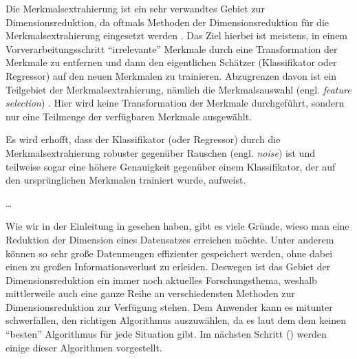 Die Merkmalsextrahierung ist ein sehr verwandtes Gebiet zur Dimensionsreduktion, da oftmals
Methoden der Dimensionsreduktion für die Merkmalsextrahierung eingesetzt werden \parencite[3]{Guyon.2006b}. Das Ziel hierbei ist meistens, in einem Vorverarbeitungsschritt
\enquote{irrelevante} Merkmale durch eine Transformation der Merkmale zu entfernen und dann den
eigentlichen Schätzer (Klassifikator oder Regressor) auf den neuen Merkmalen zu trainieren.
Abzugrenzen davon ist ein Teilgebiet der Merkmalsextrahierung, nämlich die Merkmalsauswahl (engl.
\textit{feature selection}) \parencite{Blum.1997}. Hier wird keine Transformation der Merkmale durchgeführt, sondern nur eine
Teilmenge der verfügbaren Merkmale ausgewählt.

Es wird erhofft, dass der Klassifikator (oder Regressor) durch die Merkmalsextrahierung robuster
gegenüber Rauschen (engl. \textit{noise}) ist und teilweise sogar eine höhere Genauigkeit gegenüber
einem Klassifikator, der auf den ursprünglichen Merkmalen trainiert wurde, aufweist.

\ldots

Wie wir in der Einleitung in  gesehen haben, gibt es viele Gründe, wieso man
eine Reduktion der Dimension eines Datensatzes erreichen möchte. Unter anderem können so sehr große
Datenmengen effizienter gespeichert werden, ohne dabei einen zu großen Informationsverlust zu
erleiden. Deswegen ist das Gebiet der Dimensionsreduktion ein immer noch aktuelles Forschungsthema,
weshalb mittlerweile auch eine ganze Reihe an verschiedensten Methoden zur Dimensionsreduktion zur
Verfügung stehen. Dem Anwender kann es mitunter schwerfallen, den richtigen Algorithmus
auszuwählen, da es laut dem dem  \parencite{Wolpert.1997} keinen \enquote{besten} Algorithmus für jede Situation gibt. Im nächsten
Schritt () werden einige dieser Algorithmen vorgestellt.
